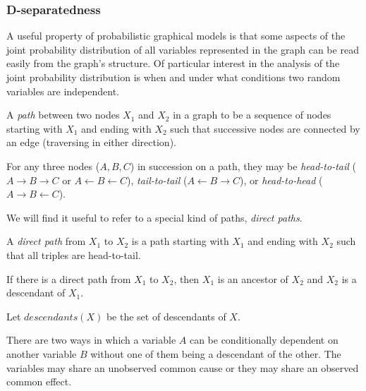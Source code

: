 \documentclass[../thesis.tex]{subfiles}
\begin{document}

\subsubsection{D-separatedness}

A useful property of probabilistic graphical models
is that some aspects of the joint probability
distribution of all variables represented in the graph
can be read easily from the graph's structure.
Of particular interest in the analysis of the joint probability
distribution is when and under what conditions
two random variables are independent.

\begin{dfn}[Path]
A \emph{path} between two nodes \(X_1\) and \(X_2\)  in a graph 
to be a sequence of nodes starting with \(X_1\) and ending with \(X_2\)
such that successive nodes are connected by an edge (traversing
in either direction).
\end{dfn}

\begin{dfn}
For any three nodes (\(A, B,C\)) in succession on a
path, they may be \emph{head-to-tail} 
(\(A \rightarrow B \rightarrow C\) or \(A \leftarrow B \leftarrow C\)), 
\emph{tail-to-tail} (\(A \leftarrow B \rightarrow C\)), or \emph{head-to-head}
(\(A \rightarrow B \leftarrow C\)).
\end{dfn}

We will find it useful to refer to a special kind of paths, \emph{direct paths}.

\begin{dfn}
  A \emph{direct path} from \(X_1\) to \(X_2\)
  is a path starting with \(X_1\) and ending with \(X_2\)
  such that all triples are head-to-tail.
\end{dfn}

\begin{dfn}
  If there is a direct path from \(X_1\) to \(X_2\),
  then $X_1$ is an ancestor of $X_2$ and $X_2$ is a descendant
  of $X_1$.

  Let $descendants(X)$ be the set of descendants of $X$.
\end{dfn}


There are two ways in which a variable
\(A\) can be conditionally dependent on another variable \(B\) without
one of them being a descendant of the other.
The variables may share an unobserved common cause
or they may share an observed common effect.
\end{document}
